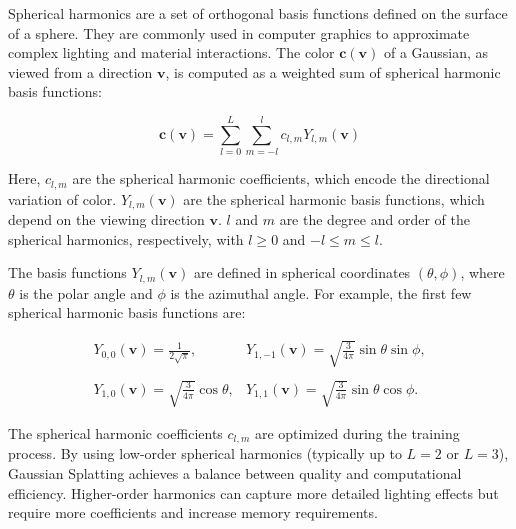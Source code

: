 Spherical harmonics are a set of orthogonal basis functions defined on the surface of a sphere. They are commonly used in computer graphics to approximate complex lighting and material interactions. The color \(\mathbf{c}(\mathbf{v})\) of a Gaussian, as viewed from a direction \(\mathbf{v}\), is computed as a weighted sum of spherical harmonic basis functions:

\begin{equation}
\mathbf{c}(\mathbf{v}) = \sum_{l=0}^L \sum_{m=-l}^l c_{l,m} Y_{l,m}(\mathbf{v})
\label{eq:sh}
\end{equation}

Here, \(c_{l,m}\) are the spherical harmonic coefficients, which encode the directional variation of color. \(Y_{l,m}(\mathbf{v})\) are the spherical harmonic basis functions, which depend on the viewing direction \(\mathbf{v}\). \(l\) and \(m\) are the degree and order of the spherical harmonics, respectively, with \(l \geq 0\) and \(-l \leq m \leq l\).

The basis functions \(Y_{l,m}(\mathbf{v})\) are defined in spherical coordinates \((\theta, \phi)\), where \(\theta\) is the polar angle and \(\phi\) is the azimuthal angle. For example, the first few spherical harmonic basis functions are:

\begin{equation}
\begin{array}{cc}
    Y_{0,0}(\mathbf{v}) = \frac{1}{2\sqrt{\pi}}, &
    Y_{1,-1}(\mathbf{v}) = \sqrt{\frac{3}{4\pi}} \sin\theta \sin\phi, \\ \\
    Y_{1,0}(\mathbf{v}) = \sqrt{\frac{3}{4\pi}} \cos\theta, &
    Y_{1,1}(\mathbf{v}) = \sqrt{\frac{3}{4\pi}} \sin\theta \cos\phi.
\end{array}
\end{equation}

The spherical harmonic coefficients \(c_{l,m}\) are optimized during the training process. By using low-order spherical harmonics (typically up to \(L = 2\) or \(L = 3\)), Gaussian Splatting achieves a balance between quality and computational efficiency. Higher-order harmonics can capture more detailed lighting effects but require more coefficients and increase memory requirements.

